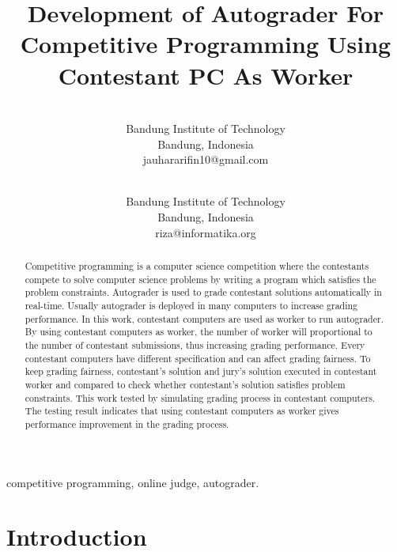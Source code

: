 \documentclass[conference]{IEEEtran}
\begin{document}
\title{Development of Autograder For Competitive Programming Using Contestant PC As Worker}

\author{
 \\
Bandung Institute of Technology\\
Bandung, Indonesia \\
jauhararifin10@gmail.com
\and
{}
 \\
Bandung Institute of Technology\\
Bandung, Indonesia \\
riza@informatika.org}

\maketitle

\begin{abstract}
Competitive programming is a computer science competition where the contestants compete to solve computer science problems by writing a program which satisfies the problem constraints.
Autograder is used to grade contestant solutions automatically in real-time. Usually autograder is deployed in many computers to increase grading performance. In this work, contestant computers are used as worker to run autograder. By using contestant computers as worker, the number of worker will proportional to the number of contestant submissions, thus increasing grading performance. Every contestant computers have different specification and can affect grading fairness. To keep grading fairness, contestant's solution and jury's solution executed in contestant worker and compared to check whether contestant's solution satisfies problem constraints. This work tested by simulating grading process in contestant computers. The testing result indicates that using contestant computers as worker gives performance improvement in the grading process.
\end{abstract}

\begin{IEEEkeywords}
competitive programming, online judge, autograder.
\end{IEEEkeywords}

\section{Introduction}
\end{document}

